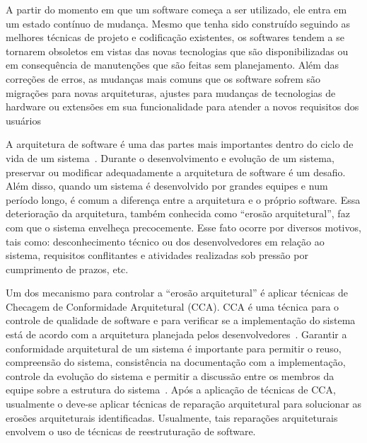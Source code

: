 \documentclass[12pt]{article}
\begin{document}
A partir do momento em que um software começa a ser utilizado, ele entra em um estado contínuo de mudança. Mesmo que tenha sido construído seguindo as melhores técnicas de projeto e codificação existentes, os softwares tendem a se tornarem obsoletos em vistas das novas tecnologias que são disponibilizadas ou em consequência de manutenções que são feitas sem planejamento. Além das correções de erros, as mudanças mais comuns que os software sofrem são migrações para novas arquiteturas, ajustes para mudanças de tecnologias de hardware ou extensões em sua funcionalidade para atender a novos requisitos dos usuários~\cite{Krueger92, SoftwareReuse}

A arquitetura de software é uma das partes mais importantes dentro do ciclo de vida de um sistema~\cite{Garcia2009}. Durante o desenvolvimento e evolução de um sistema, preservar ou modificar adequadamente a arquitetura de software é um desafio. Além disso, quando um sistema é desenvolvido por grandes equipes e num período longo, é comum a diferença entre a arquitetura e o próprio software. Essa deterioração da arquitetura, também conhecida como ``erosão arquitetural'', faz com que o sistema envelheça precocemente. Esse fato ocorre por diversos motivos, tais como: desconhecimento técnico ou dos desenvolvedores em relação ao sistema, requisitos conflitantes e atividades realizadas sob pressão por cumprimento de prazos, etc.

Um dos mecanismo para controlar a ``erosão arquitetural'' é aplicar técnicas de Checagem de Conformidade Arquitetural (CCA). CCA é uma técnica para o controle de qualidade de software e para verificar se a implementação do sistema está de acordo com a arquitetura planejada pelos desenvolvedores~\cite{Knodel_2007}. Garantir a conformidade arquitetural de um sistema é importante para permitir o reuso, compreensão do sistema, consistência na documentação com a implementação, controle da evolução do sistema e permitir a discussão entre os membros da equipe sobre a estrutura do sistema~\cite{Maffort_2013}. 
Após a aplicação de técnicas de CCA, usualmente o deve-se aplicar técnicas de reparação arquitetural para solucionar as erosões arquiteturais identificadas. Usualmente, tais reparações arquiteturais envolvem o uso de técnicas de reestruturação de software.
\end{document}
